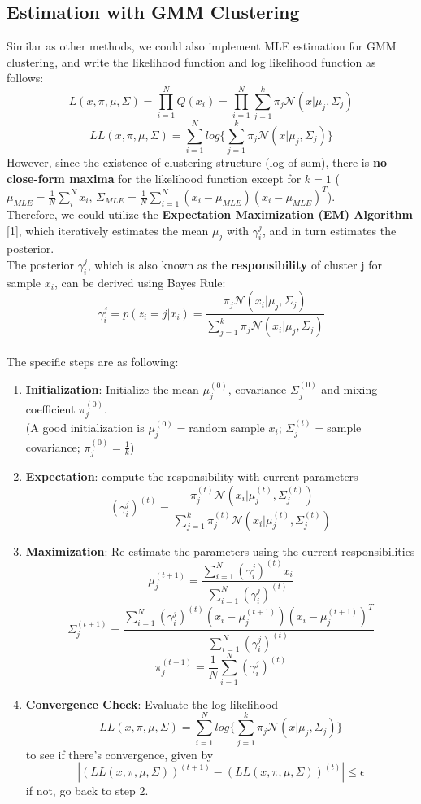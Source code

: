 \documentclass{article}
\renewcommand{\cite}[1]{[#1]}
\begin{document}
\subsection{Estimation with GMM Clustering}
Similar as other methods, we could also implement MLE estimation for GMM clustering, and write the likelihood function and log likelihood function as follows:\[
L(x,\pi,\mu,\Sigma)=\prod_{i=1}^{N}Q(x_i)=\prod_{i=1}^{N}\sum_{j=1}^{k}\pi_{j}\mathcal{N}(x|\mu_{j},\Sigma_{j})
\]
\[
LL(x,\pi,\mu,\Sigma)=\sum_{i=1}^{N}log\{\sum_{j=1}^{k}\pi_{j}\mathcal{N}(x|\mu_{j},\Sigma_{j})\}\]
However, since the existence of clustering structure (log of sum), there is \textbf{no close-form maxima} for the likelihood function except for $k=1$ ($\mu_{MLE}=\frac{1}{N}\sum_{i}^{N}x_i$, $\Sigma_{MLE}=\frac{1}{N}\sum_{i=1}^{N}(x_i-\mu_{MLE})(x_i-\mu_{MLE})^{T}$).\\
Therefore, we could utilize the \textbf{Expectation Maximization (EM) Algorithm} \cite{1}, which iteratively estimates the mean $\mu_j$ with $\gamma_i^{j}$, and in turn estimates the posterior.\\
The posterior $\gamma_i^{j}$, which is also known as the \textbf{responsibility} of cluster j for sample $x_i$, can be derived using Bayes Rule:\[
\gamma_i^{j}=p(z_i=j|x_i)=\frac{\pi_j\mathcal{N}(x_i|\mu_j,\Sigma_j)}{\sum_{j=1}^{k}\pi_j\mathcal{N}(x_i|\mu_j,\Sigma_j)}
\]\\
The specific steps are as following:
\begin{enumerate}
    \item \textbf{Initialization}: Initialize the mean $\mu_j^{(0)}$, covariance $\Sigma_j^{(0)}$ and mixing coefficient $\pi_j^{(0)}$.\\ (A good initialization is $\mu_j^{(0)} = $random sample $x_i$; $\Sigma_j^(t)=$sample covariance; $\pi_j^{(0)}=\frac{1}{k}$)
    \item \textbf{Expectation}: compute the responsibility with current parameters\[
    (\gamma_i^j)^{(t)}=\frac{\pi_j^{(t)}\mathcal{N}(x_i|\mu_j^{(t)},\Sigma_j^{(t)})}{\sum_{j=1}^{k}\pi_j^{(t)}\mathcal{N}(x_i|\mu_j^{(t)},\Sigma_j^{(t)})}
    \]
    \item \textbf{Maximization}: Re-estimate the parameters using the current responsibilities\[
    \mu_j^{(t+1)}=\frac{\sum_{i=1}^{N}(\gamma_i^{j})^{(t)}x_i}{\sum_{i=1}^{N}(\gamma_{i}^{j})^{(t)}}
    \]
    \[
    \Sigma_j^{(t+1)}=\frac{\sum_{i=1}^{N}(\gamma_i^{j})^{(t)}(x_i-\mu_j^{(t+1)})(x_i-\mu_j^{(t+1)})^{T}}{\sum_{i=1}^{N}(\gamma_i^{j})^{(t)}}
    \]
    \[
    \pi_j^{(t+1)}=\frac{1}{N}\sum_{i=1}^{N}(\gamma_i^{j})^{(t)}
    \]
    \item \textbf{Convergence Check}: Evaluate the log likelihood\[
    LL(x,\pi,\mu,\Sigma)=\sum_{i=1}^{N}log\{\sum_{j=1}^{k}\pi_{j}\mathcal{N}(x|\mu_{j},\Sigma_{j})\}
    \] to see if there's convergence, given by\[
    |(LL(x,\pi,\mu,\Sigma))^{(t+1)} - (LL(x,\pi,\mu,\Sigma))^{(t)}| \leq \epsilon
    \]if not, go back to step 2.
\end{enumerate}
\end{document}
